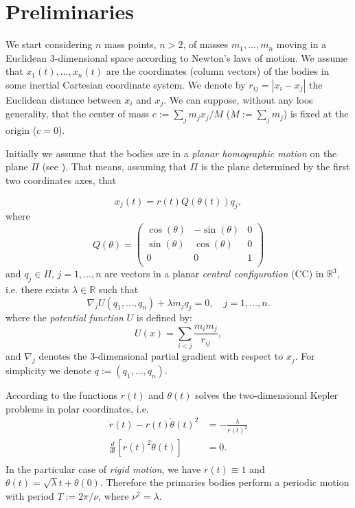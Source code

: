 \documentclass[twoside]{article}
\theoremstyle{remark}
\newcommand{\rr}{\mathbb{R}}
\begin{document}
\section{Preliminaries}\label{sec:pre}

We start considering $n$  mass points, $n>2$, of masses $m_1,\ldots,m_n$ moving in a Euclidean 3-dimensional space according to Newton's laws of motion. We assume that $x_1(t),\ldots,x_n(t)$ are the coordinates (column vectors) of the bodies in some inertial Cartesian coordinate system. We denote by $r_{ij}=|x_i-x_j|$  the  Euclidean distance between $x_i$ and $x_j$. We can suppose, without any loos generality, that the center of mass   $c:=\sum_jm_jx_j/M$ ($M:=\sum_j m_j$) is fixed at the origin ($c=0$).

Initially we assume that the bodies are in a \emph{planar homographic motion} on the plane $\Pi$ (see \cite{JaumeLlibre276}). That means, assuming that  $\Pi$ is the plane determined by the first two coordinates axes, that

\begin{equation}\label{eq:x_j=rtQtq_j}
 x_j(t)=r(t)Q(\theta (t))q_j,
\end{equation}
where
\[
 Q(\theta )=\begin{pmatrix}
           \cos(\theta ) & -\sin(\theta ) & 0\\
           \sin(\theta ) & \cos(\theta ) & 0\\
           0            &     0     &  1\\
          \end{pmatrix}
\]
and $q_j\in\Pi$, $j=1,\ldots,n$ are vectors in a planar \emph{central configuration} (CC) in $\rr^3$, i.e. there exists $\lambda\in\rr$ such that
\begin{equation}\label{eq:def.CC}
\nabla_jU(q_1,\ldots,q_n)+\lambda m_jq_j=0,\quad j=1,\ldots,n.
\end{equation}
where the \emph{potential function} $U$ is defined by:
\begin{equation}\label{eq:potencial}
 U(x)=\sum_{i<j}\frac{m_im_j}{r_{ij}},
\end{equation}
and $\nabla_j$ denotes the $3$-dimensional partial gradient with respect to $x_j$. For simplicity we denote $q:=(q_1,\ldots,q_n)$.

According to \cite[Eq. (2.16)]{JaumeLlibre276}  the functions $r(t)$ and $\theta (t)$ solves the two-dimensional Kepler problems in polar coordinates, i.e.
\begin{equation}
 \begin{array}{rl}\label{eq:kepler.2.dim}
\ddot{r}(t)-r(t)\dot{\theta}(t)^2 & = -\frac{\lambda}{r(t)^2}\\
\frac{d }{dt}\left[ r(t)^2\dot{\theta}(t)\right] & =0.\\
\end{array}
\end{equation}
In the particular case of \emph{rigid motion}, we have  $r(t)\equiv 1$ and $\theta (t)=\sqrt{\lambda }t +\theta(0)$. Therefore the primaries bodies perform a periodic motion with period $T:=2\pi/\nu$, where $\nu^2=\lambda$.
\end{document}
